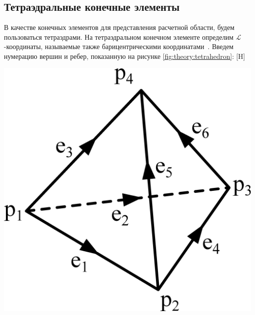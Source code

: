 \documentclass[a4paper,14pt]{article}
\makeatletter
\renewenvironment{figure}[1][\fps@figure]{
  \edef\@tempa{\noexpand\@float{figure}[#1]}
  \@tempa
  \addtocounter{foofigure}{1}
}{
  \end@float
}
\makeatother
\begin{document}

\subsection{Тетраэдральные конечные элементы}

В качестве конечных элементов для представления расчетной области, будем пользоваться тетраэдрами. На тетраэдральном конечном элементе определим $\mathcal{L}$-ко\-ор\-ди\-на\-ты, называемые также барицентрическими координатами~\citep{soloveychick}. Введем нумерацию вершин и ребер, показанную на рисунке \ref{fig:theory:tetrahedron}:
\begin{figure}[H]
	\centering
	\includegraphics[scale=0.25]{theory/tetrahedron.eps}
	\caption{тетраэдральный конечный элемент}
	\label{fig:theory:tetrahedron}
\end{figure}
\end{document}
